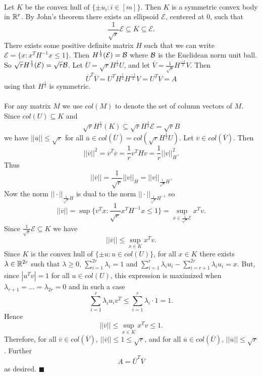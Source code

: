\documentclass[letterpaper,12pt,oneside,onecolumn]{article}
\newcommand{\cE}{\mathcal{E}} \newcommand{\cF}{\mathcal{F}}
\begin{document}
\paragraph{}
Let $K$ be the convex hull of $\{ \pm u_i : i \in [m]\}$. Then $K$ is a symmetric convex body in $\mathbb{R}^r$. By John's theorem there exists an ellipsoid $\cE$, centered at $0$, such that
$$ \frac{1}{\sqrt{r}} \cE \subseteq K \subseteq \cE.$$
There exists some positive definite matrix $H$ such that we can write $\cE = \{ x : x^TH^{-1}x \leq 1\}$. Then $H^\frac{1}{2} (\cE) = \cB$ where $\mathcal{B}$ is the Euclidean norm unit ball. So $\sqrt{r}H^\frac{1}{2}(\cE) = \sqrt{r}\cB$. Let $\overline{U} = \sqrt{r}H^\frac{1}{2}U$, and let $\overline{V} = \frac{1}{\sqrt{r}} H^\frac{-1}{2}V$. Then
$$\overline{U}^T\overline{V} = U^TH^\frac{1}{2}H^\frac{-1}{2}V = U^TV = A$$
using that $H^\frac{1}{2}$ is symmetric.
\paragraph{}
For any matrix $M$ we use $col(M)$ to denote the set of column vectors of $M$. Since $col(U) \subseteq K$ and $$\sqrt{r}H^\frac{1}{2}(K) \subseteq \sqrt{r}H^\frac{1}{2} \cE = \sqrt{r} B$$
we have $||\overline{u}|| \leq \sqrt{r}$ for all $\overline{u} \in col(\overline{U}) = col(\sqrt{r}H^\frac{1}{2}U)$. Let $\overline{v} \in col(\overline{V})$. Then 
$$||\overline{v}||^2 = \overline{v}^T \overline{v} = \frac{1}{r}v^THv = \frac{1}{r} ||v||_H^2.$$
Thus
$$||\overline{v}|| = \frac{1}{\sqrt{r}} ||v||_H = ||v||_{\frac{1}{\sqrt{r}}H}.$$
Now the norm $||\cdot ||_{\frac{1}{\sqrt{r}}H}$ is dual to the norm $||\cdot||_{\frac{1}{\sqrt{r}}H^{-1}}$ so 
$$||\overline{v}|| = \sup \{ v^Tx : \frac{1}{\sqrt{r}} x^TH^{-1}x \leq 1\} = \sup_{x \in \frac{1}{\sqrt{r}}\cE} x^Tv.$$
Since $\frac{1}{\sqrt{r}}\cE \subseteq K$ we have
$$||\overline{v}|| \leq \sup_{x \in K} x^Tv.$$
Since $K$ is the convex hull of $\{\pm u : u \in col(U)\}$, for all $x \in K$ there exists $\lambda \in \mathbb{R}^{2r}$ such that $\lambda \geq 0$, $\sum_{i=1}^{2r} \lambda_i = 1$ and $\sum_{i=1}^r \lambda_i u_i - \sum_{i=r+1}^{2r} \lambda_i u_i = x$. But, since $|u^Tv| =1$ for all $u \in col(U)$, this expression is maximized when $\lambda_{r+1} = \dots = \lambda_{2r} = 0$ and in such a case 
$$\sum_{i=1}^r \lambda_i u_iv^T \leq \sum_{i=1}^r\lambda_i\cdot 1 = 1.$$
Hence
$$||\overline{v}|| \leq \sup_{x \in K} x^Tv \leq 1.$$
Therefore, for all $\overline{v} \in col(\overline{V})$, $||\overline{v}|| \leq 1\leq \sqrt{r}$, and for all $\overline{u} \in col(\overline{U})$, $||\overline{u}|| \leq \sqrt{r}$. Further
$$A = \overline{U}^T\overline{V}$$
as desired. $\blacksquare$
\end{document}
